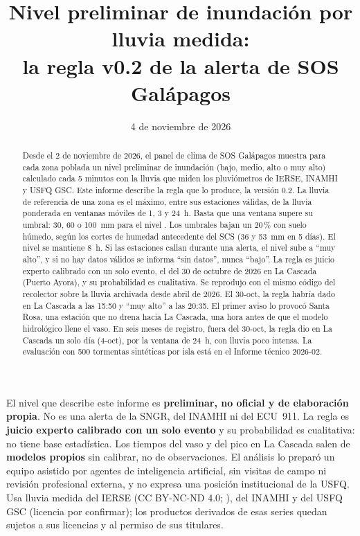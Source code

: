 \documentclass{sosg-informe}
\title{Nivel preliminar de inundación por lluvia medida:\\la regla v0.2 de la alerta de SOS Galápagos}
\date{4 de noviembre de 2026}
\begin{document}
\maketitle

\begin{abstract}
Desde el 2 de noviembre de 2026, el panel de clima de SOS Galápagos muestra para cada zona poblada un nivel preliminar de inundación (bajo, medio, alto o muy alto) calculado cada 5 minutos con la lluvia que miden los pluviómetros de IERSE, INAMHI y USFQ GSC. Este informe describe la regla que lo produce, la versión 0.2. La lluvia de referencia de una zona es el máximo, entre sus estaciones válidas, de la lluvia ponderada en ventanas móviles de 1, 3 y 24~h. Basta que una ventana supere su umbral: 30, 60 o 100~mm para el nivel \alto. Los umbrales bajan un 20\,\% con suelo húmedo, según los cortes de humedad antecedente del SCS (36 y 53~mm en 5 días). El nivel se mantiene 8~h. Si las estaciones callan durante una alerta, el nivel sube a \enquote{muy alto}, y si no hay datos válidos se informa \enquote{sin datos}, nunca \enquote{bajo}. La regla es juicio experto calibrado con un solo evento, el del 30 de octubre de 2026 en La Cascada (Puerto Ayora), y su probabilidad es cualitativa. Se reprodujo con el mismo código del recolector sobre la lluvia archivada desde abril de 2026. El 30-oct, la regla habría dado \alto{} en La Cascada a las 15:50 y \enquote{muy alto} a las 20:35. El primer aviso lo provocó Santa Rosa, una estación que no drena hacia La Cascada, una hora antes de que el modelo hidrológico llene el vaso. En seis meses de registro, fuera del 30-oct, la regla dio \alto{} en La Cascada un solo día (4-oct), por la ventana de 24~h, con lluvia poco intensa. La evaluación con 500 tormentas sintéticas por isla está en el Informe técnico 2026-02.
\end{abstract}

\begin{aviso}
El nivel que describe este informe es \textbf{preliminar, no oficial y de elaboración propia}. No es una alerta de la SNGR, del INAMHI ni del ECU~911. La regla es \textbf{juicio experto calibrado con un solo evento} y su probabilidad es cualitativa: no tiene base estadística. Los tiempos del vaso y del pico en La Cascada salen de \textbf{modelos propios} sin calibrar, no de observaciones. El análisis lo preparó un equipo asistido por agentes de inteligencia artificial, sin visitas de campo ni revisión profesional externa, y no expresa una posición institucional de la USFQ. Usa lluvia medida del IERSE (CC BY-NC-ND 4.0; \citealp{orellana2023}), del INAMHI y del USFQ GSC (licencia por confirmar); los productos derivados de esas series quedan sujetos a sus licencias y al permiso de sus titulares.
\end{aviso}
\end{document}
